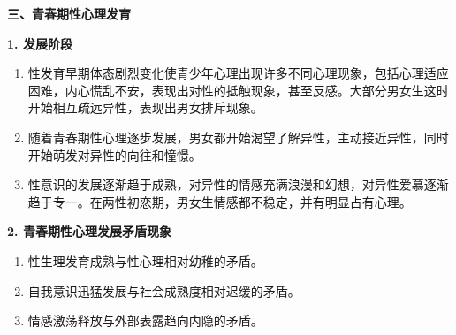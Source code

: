 \begin{defbox}
\textbf{三、青春期性心理发育}

\textbf{1. 发展阶段}
\begin{enumerate}[leftmargin=*]
    \item {}性发育早期体态剧烈变化使青少年心理出现许多不同心理现象，包括心理适应困难，内心慌乱不安，表现出对性的抵触现象，甚至反感。大部分男女生这时开始相互疏远异性，表现出男女排斥现象。
    \item {}随着青春期性心理逐步发展，男女都开始渴望了解异性，主动接近异性，同时开始萌发对异性的向往和憧憬。
    \item {}性意识的发展逐渐趋于成熟，对异性的情感充满浪漫和幻想，对异性爱慕逐渐趋于专一。在两性初恋期，男女生情感都不稳定，并有明显占有心理。
\end{enumerate}

\textbf{2. 青春期性心理发展矛盾现象}
\begin{enumerate}[leftmargin=*]
    \item 性生理发育成熟与性心理相对幼稚的矛盾。
    \item 自我意识迅猛发展与社会成熟度相对迟缓的矛盾。
    \item 情感激荡释放与外部表露趋向内隐的矛盾。
\end{enumerate}

\vspace{3pt}
\begin{center}
\end{center}
\vspace{3pt}
\end{defbox}

\newpage
